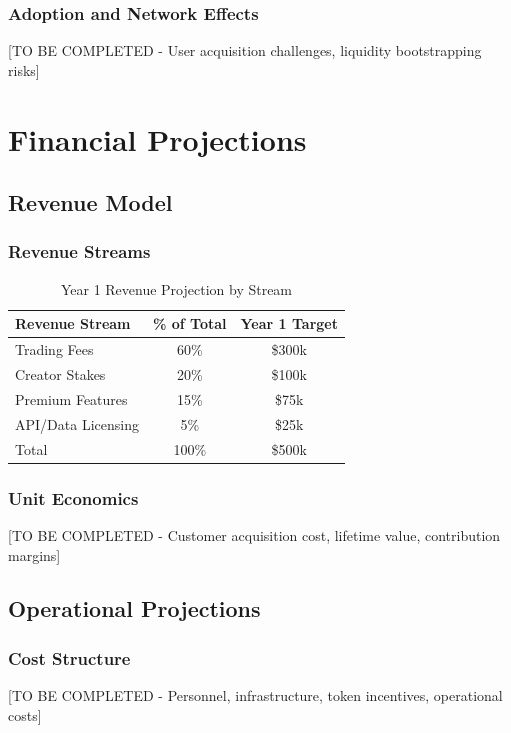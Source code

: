 \documentclass[11pt,a4paper]{article}
\begin{document}
\subsubsection{Adoption and Network Effects}
[TO BE COMPLETED - User acquisition challenges, liquidity bootstrapping risks]

\section{Financial Projections}

\subsection{Revenue Model}

\subsubsection{Revenue Streams}
\begin{table}[h]
    \centering
    \begin{tabular}{@{}lcc@{}}
        \toprule
        Revenue Stream & \% of Total & Year 1 Target \\
        \midrule
        Trading Fees & 60\% & \$300k \\
        Creator Stakes & 20\% & \$100k \\
        Premium Features & 15\% & \$75k \\
        API/Data Licensing & 5\% & \$25k \\
        \midrule
        Total & 100\% & \$500k \\
        \bottomrule
    \end{tabular}
    \caption{Year 1 Revenue Projection by Stream}
    \label{tab:revenue-streams}
\end{table}

\subsubsection{Unit Economics}
[TO BE COMPLETED - Customer acquisition cost, lifetime value, contribution margins]

\subsection{Operational Projections}

\subsubsection{Cost Structure}
[TO BE COMPLETED - Personnel, infrastructure, token incentives, operational costs]
\end{document}
